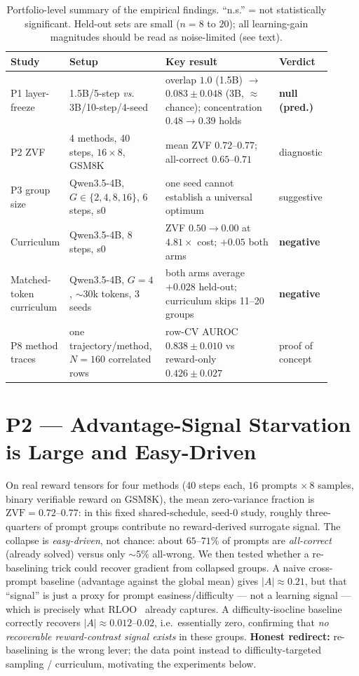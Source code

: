 \documentclass[12pt,a4paper]{report}
\newcommand{\zvf}{\mathrm{ZVF}}
\begin{document}
\begin{table}[t]
\centering
\small
\begin{tabular}{@{}L{0.14\linewidth}L{0.30\linewidth}L{0.37\linewidth}L{0.10\linewidth}@{}}
\toprule
\textbf{Study} & \textbf{Setup} & \textbf{Key result} & \textbf{Verdict} \\
\midrule
P1 layer-freeze
& 1.5B/5-step \emph{vs.} 3B/10-step/4-seed
& overlap $1.0$ (1.5B) $\to$ $0.083\pm0.048$ (3B, ${\approx}$chance); concentration $0.48{\to}0.39$ holds
& \textbf{null (pred.)} \\
P2 ZVF
& 4 methods, 40 steps, $16\times8$, GSM8K
& mean ZVF $0.72$--$0.77$; all-correct $0.65$--$0.71$
& diagnostic \\
P3 group size
& Qwen3.5-4B, $G\in\{2,4,8,16\}$, 6 steps, s0
& one seed cannot establish a universal optimum
& suggestive \\
Curriculum
& Qwen3.5-4B, 8 steps, s0
& ZVF $0.50\to0.00$ at $4.81\times$ cost; $+0.05$ both arms
& \textbf{negative} \\
Matched-token curriculum
& Qwen3.5-4B, $G{=}4$, ${\sim}30$k tokens, 3 seeds
& both arms average $+0.028$ held-out; curriculum skips 11--20 groups
& \textbf{negative} \\
P8 method traces
& one trajectory/method, $N=160$ correlated rows
& row-CV AUROC $0.838\pm0.010$ vs reward-only $0.426\pm0.027$
& proof of concept \\
\bottomrule
\end{tabular}
\caption{Portfolio-level summary of the empirical findings. ``n.s.'' = not
statistically significant. Held-out sets are small ($n=8$ to $20$); all
learning-gain magnitudes should be read as noise-limited (see text).}
\label{tab:summary}
\end{table}

\section{P2 --- Advantage-Signal Starvation is Large and Easy-Driven}
On real reward tensors for four methods (40 steps each, $16$ prompts $\times\,8$
samples, binary verifiable reward on GSM8K), the mean zero-variance fraction is
$\zvf = 0.72$--$0.77$: in this fixed shared-schedule, seed-0 study, roughly
three-quarters of prompt groups contribute no reward-derived surrogate signal.
The collapse is \emph{easy-driven}, not chance: about $65$--$71\%$ of
prompts are \emph{all-correct} (already solved) versus only ${\sim}5\%$ all-wrong.
We then tested whether a re-baselining trick could recover gradient from collapsed
groups. A naive cross-prompt baseline (advantage against the global mean) gives
$|A|\approx0.21$, but that ``signal'' is just a proxy for prompt
easiness/difficulty --- not a learning signal --- which is precisely what
RLOO~\cite{ahmadian2024rloo} already captures. A difficulty-isocline baseline
correctly recovers $|A|\approx0.012$--$0.02$, i.e.\ essentially zero, confirming that
\emph{no recoverable reward-contrast signal exists} in these groups. \textbf{Honest redirect:}
re-baselining is the wrong lever; the data point instead to difficulty-targeted
sampling / curriculum, motivating the experiments below.
\end{document}
